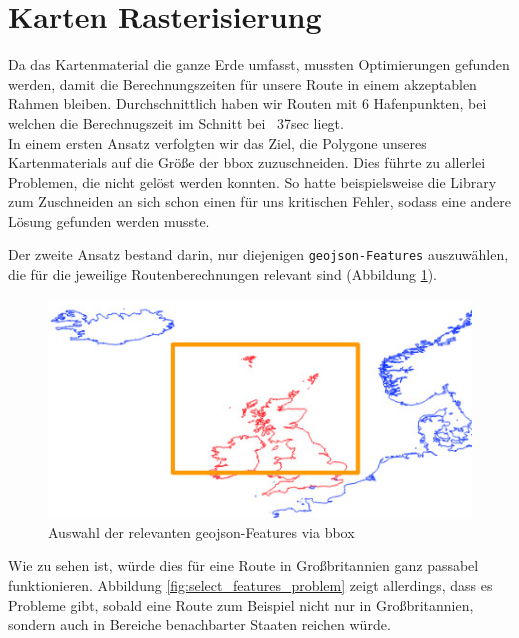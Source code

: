 \documentclass[letterpaper]{article}
\begin{document}
\section{Karten Rasterisierung}
	Da das Kartenmaterial die ganze Erde umfasst, mussten Optimierungen gefunden werden, damit die Berechnungszeiten für unsere Route in einem akzeptablen Rahmen bleiben. Durchschnittlich haben wir Routen mit 6 Hafenpunkten, bei welchen die Berechnugszeit im Schnitt bei ~37sec liegt.\\

	In einem ersten Ansatz verfolgten wir das Ziel, die Polygone unseres Kartenmaterials auf die Größe der bbox zuzuschneiden. Dies führte zu allerlei Problemen, die nicht gelöst werden konnten. So hatte beispielsweise die Library zum Zuschneiden an sich schon einen für uns kritischen Fehler\footnotemark, sodass eine andere Lösung gefunden werden musste.

	Der zweite Ansatz bestand darin, nur diejenigen \texttt{geojson-Features} auszuwählen, die für die jeweilige Routenberechnungen relevant sind (Abbildung \ref{fig:select_features}).

	\begin{figure}[!htbp]
		\centering
		\includegraphics[width=\linewidth]{select_features}
		\caption{Auswahl der relevanten geojson-Features via bbox}
		\label{fig:select_features}
	\end{figure}

	Wie zu sehen ist, würde dies für eine Route in Großbritannien ganz passabel funktionieren. Abbildung \ref{fig:select_features_problem} zeigt allerdings, dass es Probleme gibt, sobald eine Route zum Beispiel nicht nur in Großbritannien, sondern auch in Bereiche benachbarter Staaten reichen würde. 
\end{document}
